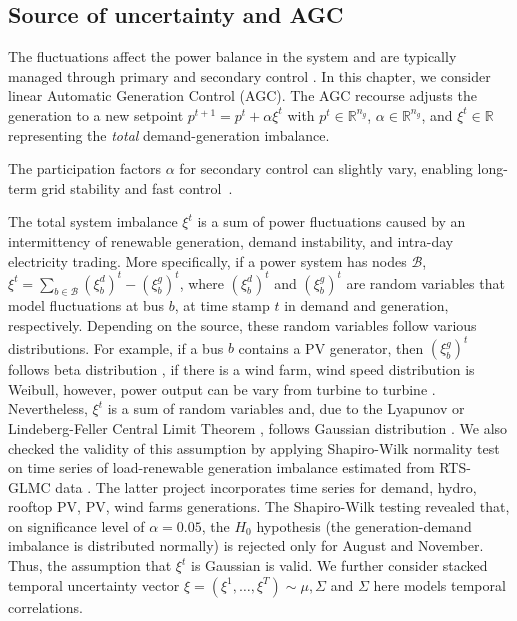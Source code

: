 \subsection{Source of uncertainty and AGC}
\label{sec:fluctuations}
\vspace{-2mm}

The fluctuations affect the power balance in the system and are typically managed through primary and secondary control \cite{machowski2020power}. In this chapter, we consider linear Automatic Generation Control (AGC). The AGC recourse adjusts the generation to a new setpoint $p^{t+1} = p^t + \alpha \xi^t$ \cite{roald2017chance,baros2021examining,mezghani2020stochastic} with $p^t \in \mathbb{R}^{n_g}$, $\alpha \in \mathbb{R}^{n_g}$, and $\xi^t \in \mathbb{R}$ representing the \emph{total} demand-generation imbalance.

The participation factors $\alpha$ for secondary control can slightly vary, enabling long-term grid stability and fast control~\cite{machowski2020power}. 


The total system imbalance $\xi^{t}$ is a sum of power fluctuations caused by an intermittency of renewable generation, demand instability, and intra-day electricity trading. More specifically, if a power system has nodes $\mathcal{B}$, $\xi^t = \sum_{b \in \mathcal{B}} (\xi_b^d)^t - (\xi_b^g)^t$, where $(\xi_b^d)^t$ and $(\xi_b^g)^t$ are random variables that model fluctuations at bus $b$, at time stamp $t$ in demand and generation, respectively. Depending on the source, these random variables follow various distributions. For example, if a bus $b$ contains a PV generator, then $(\xi_b^g)^t$ follows beta distribution \cite{wang2010probabilistic}, if there is a wind farm, wind speed distribution is Weibull, however, power output can be vary from turbine to turbine \cite{dhople2012framework}. Nevertheless, $\xi^t$ is a sum of random variables and, due to the Lyapunov or Lindeberg-Feller Central Limit Theorem \cite{scholz2011central}, follows Gaussian distribution \cite{rouaud2013probability, draper2021practical}. We also checked the validity of this assumption by applying Shapiro-Wilk normality test \cite{shapiro1965analysis} on time series of load-renewable generation imbalance estimated from RTS-GLMC data \cite{barrows2019ieee}. The latter project incorporates time series for demand, hydro, rooftop PV, PV, wind farms generations. The Shapiro-Wilk testing revealed that, on significance level of $\alpha=0.05$, the $H_0$ hypothesis (the generation-demand imbalance is distributed normally) is rejected only for August and November. Thus, the assumption that $\xi^t$ is Gaussian is valid. We further consider stacked temporal uncertainty vector $\xi = (\xi^1, \dots, \xi^T) \sim \mathcal{\mu, \Sigma}$ and $\Sigma$ here models temporal correlations.

